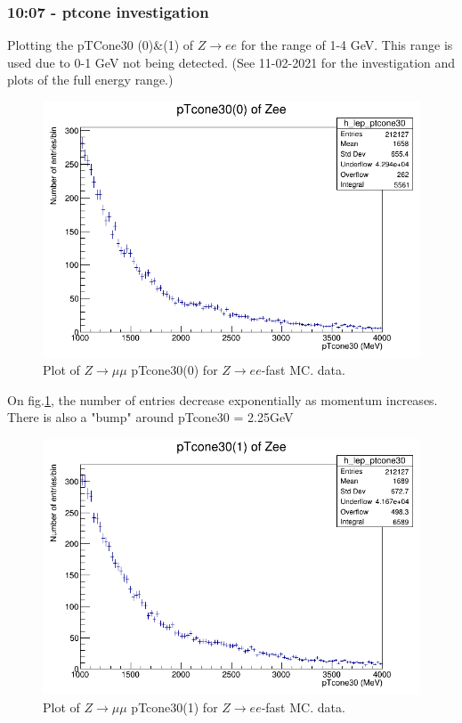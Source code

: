 \subsubsection*{10:07 - ptcone investigation}
Plotting the pTCone30 (0)\&(1) of $Z\rightarrow ee$ for the range of 1-4 GeV. This range is used due to 0-1 GeV not being detected. (See 11-02-2021 for the investigation and plots of the full energy range.)

\begin{figure}[h!]
    \centering
	\includegraphics[width=0.85\linewidth]{plots/16-02-2021/Zee_fast_pTcone30(0)_1-4GeV_16-02-21_10-07.png}
	\caption{Plot of  $Z \rightarrow \mu\mu$ pTcone30(0) for $Z\rightarrow ee$-fast MC.  data.}\label{fig:/Zee_fast_pTcone30(0)_1-4GeV_16-02-21_10-07}
\end{figure}

On fig.\ref{fig:/Zee_fast_pTcone30(0)_1-4GeV_16-02-21_10-07}, the number of entries decrease exponentially as momentum increases.  There is also a "bump" around pTcone30 = 2.25GeV

\begin{figure}[h!]
    \centering
	\includegraphics[width=0.85\linewidth]{plots/16-02-2021/Zee_fast_pTcone30(1)_1-4GeV_16-02-21_10-12.png}
	\caption{Plot of  $Z \rightarrow \mu\mu$ pTcone30(1) for $Z\rightarrow ee$-fast MC.  data.}\label{fig:Zee_fast_pTcone30(1)_1-4GeV_16-02-21_10-12}
\end{figure}

